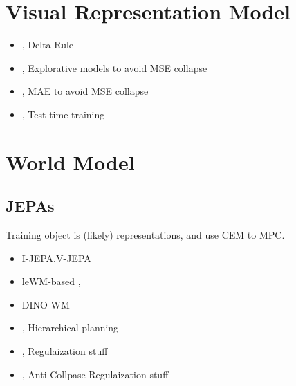 \begin{abstract}
    整理一系列文章为了后续能快速的找到内容.
\end{abstract}
\section{Visual Representation Model}
\begin{itemize}
    \item \cite{yang2024parallelizing,schlag2021linear}, Delta Rule
    \item \cite{gladstone2026explorative}, Explorative models to avoid MSE collapse
    \item \cite{bar2023stochastic}, MAE to  avoid MSE collapse
    \item \cite{sun2024learning,zhang2025testtime}, Test time training
\end{itemize}
\section{World Model}
\subsection{JEPAs}
Training object is (likely) representations, and use CEM to MPC.
\begin{itemize}
    \item I-JEPA,V-JEPA \cite{assran2025vjepa,chen2025vljepa,bardes2024revisiting,assran2023selfsupervised,murlabadia2026vjepa}
    \item leWM-based \cite{maes2026leworldmodel,klindt2026when,wang2026adajepa},
    \item DINO-WM \cite{zhou2024dinowm}
    \item \cite{zhang2026hierarchical}, Hierarchical planning 
    \item \cite{ren2026content}, Regulaization stuff
    \item \cite{sun2026sadl}, Anti-Collpase Regulaization stuff
\end{itemize}
